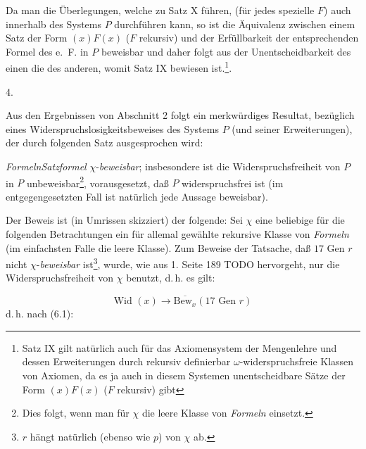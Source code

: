 \documentclass[draft]{scrartcl}
\begin{document}
Da man die Überlegungen, welche zu Satz X führen, (für jedes spezielle $F$) auch innerhalb des Systems $P$ durchführen kann, so ist die Äquivalenz zwischen einem Satz der Form $\left(x\right)F\left(x\right)$ ($F$ rekursiv) und der Erfüllbarkeit der entsprechenden Formel des e.~F. in $P$ beweisbar und daher folgt aus der Unentscheidbarkeit des einen die des anderen, womit Satz IX bewiesen ist.\footnote{Satz IX gilt natürlich auch für das Axiomensystem der Mengenlehre und dessen Erweiterungen durch rekursiv definierbar $\omega$-widerspruchsfreie Klassen von Axiomen, da es ja auch in diesem Systemen unentscheidbare Sätze der Form $\left(x\right)F\left(x\right)$ ($F$ rekursiv) gibt}.

\begin{center}
4.
\end{center}

Aus den Ergebnissen von Abschnitt 2 folgt ein merkwürdiges Resultat, bezüglich eines Widerspruchslosigkeitsbeweises des Systems $P$ (und seiner Erweiterungen), der durch folgenden Satz ausgesprochen wird:

\label{satzxi} \textit{Formeln}\textit{Satzformel} $\chi$-\textit{beweisbar}; insbesondere ist die Widerspruchsfreiheit von $P$ in $P$ unbeweisbar\footnote{Dies folgt, wenn man für 
$\chi$ die leere Klasse von \textit{Formeln} einsetzt.},
vorausgesetzt, daß $P$ widerspruchsfrei ist (im entgegengesetzten Fall ist natürlich jede Aussage beweisbar).

Der Beweis ist (in Umrissen skizziert) der folgende: Sei $\chi$ eine beliebige für die folgenden 
Betrachtungen ein für allemal gewählte rekursive Klasse von \textit{Formeln} (im einfachsten Falle die leere Klasse).
Zum Beweise der Tatsache, daß $17\text{ Gen }r$ nicht $\chi$-\textit{beweisbar} ist\footnote{$r$
hängt natürlich (ebenso wie $p$) von $\chi$ ab.}, wurde, wie aus 1. Seite 189 TODO hervorgeht,
nur die Widerspruchsfreiheit von $\chi$ benutzt, d.\,h. es gilt:

\begin{equation}
\text{Wid }\left(x\right) \longrightarrow \overline{\text{Bew}_x} \left(17\text{ Gen } r\right)
\end{equation}
d.\,h. nach (6.1):
\end{document}
